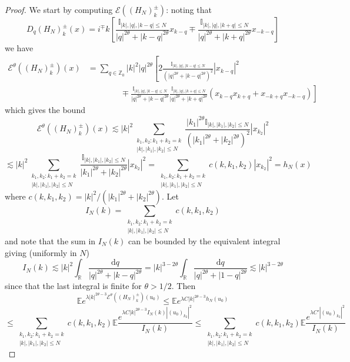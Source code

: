 \documentclass[11pt,a4paper,reqno]{amsart}
\newcommand{\II}{\mathbb{I}}
\newcommand{\RR}{\mathbb{R}}
\newcommand{\ZZ}{\mathbb{Z}}
\newcommand{\expect}{\mathbb{E}}
\newcommand{\cE}{\mathcal{E}}
\newcommand{\dd}{\mathrm{d}}
\begin{document}
\begin{proof}
We start by computing $\cE((H_N)^\pm_k)$: noting that
$$
D_q (H_{N})^\pm_k(x)=  i^\mp k  \left[  \frac{\II_{|k|,|q|,|k-q|\le N}}{|q|^{2\theta}+|k-q|^{2\theta}}  x_{k-q}\mp \frac{\II_{|k|,|q|,|k+q|\le N}}{|q|^{2\theta}+|k+q|^{2\theta}}  x_{-k-q}\right]
$$ 
we have
\begin{equation*}
\begin{split}
 \cE^\theta((H_N)^\pm_k)(x) & = \sum_{q\in\ZZ_0} |k|^2 |q|^{2\theta}\left[
 2 \frac{\II_{|k|,|q|,|k-q|\le N}}{(|q|^{2\theta}+|k-q|^{2\theta})^2}  |x_{k-q}|^2
 \right . \\
  & \left .
 \qquad \qquad \mp \frac{\II_{|k|,|q|,|k-q|\le N}}{|q|^{2\theta}+|k-q|^{2\theta}}  \frac{\II_{|k|,|q|,|k+q|\le N}}{|q|^{2\theta}+|k+q|^{2\theta}}  (x_{k-q} x_{k+q}+x_{-k+q} x_{-k-q})
 \right]
\end{split}
\end{equation*}
which gives the bound
$$
 \cE^\theta((H_N)^\pm_k)(x)\lesssim   |k|^2  \sum_{\substack{k_1,k_2 :k_1+k_2=k\\|k|,|k_1|,|k_2|\le N}} \frac{|k_1|^{2\theta}\II_{|k|,|k_1|,|k_2|\le N}}{(|k_1|^{2\theta}+|k_2|^{2\theta})^2}  |x_{k_2}|^2 
$$
$$
\lesssim  |k|^2  \sum_{\substack{k_1,k_2 :k_1+k_2=k\\|k|,|k_1|,|k_2|\le N}} \frac{\II_{|k|,|k_1|,|k_2|\le N}}{|k_1|^{2\theta}+|k_2|^{2\theta}}  |x_{k_2}|^2 =   \sum_{\substack{k_1,k_2 :k_1+k_2=k\\|k|,|k_1|,|k_2|\le N}}c(k,k_1,k_2) |x_{k_2}|^2  = h_N(x)
$$
where $c(k,k_1,k_2) = |k|^2/(|k_1|^{2\theta}+|k_2|^{2\theta})$.
Let $$
I_N(k) =  \sum_{\substack{k_1,k_2 :k_1+k_2=k\\|k|,|k_1|,|k_2|\le N}}  c(k,k_1,k_2) 
$$
and note that the sum in $I_N(k)$ can be bounded by the equivalent integral giving (uniformly in $N$)
$$
I_N(k) \lesssim  |k|^{2}  \int_{\RR} \frac{\dd q}{|q|^{2\theta}+|k-q|^{2\theta}} 
= |k|^{3-2\theta}  \int_{\RR} \frac{\dd q}{|q|^{2\theta}+|1-q|^{2\theta}} \lesssim |k|^{3-2\theta} 
$$
since that the last integral is finite for $\theta > 1/2$. Then
$$
\expect e^{\lambda |k|^{2\theta-3}\cE^\theta((H_N)^\pm_k)(u_0)} \le \expect e^{\lambda C|k|^{2\theta-3} h_N(u_0)}
$$
$$
 \le \sum_{\substack{k_1,k_2 :k_1+k_2=k\\|k|,|k_1|,|k_2|\le N}} c(k,k_1,k_2)  \expect \frac{e^{\lambda C |k|^{2\theta-3} I_N(k) |(u_0)_{k_2}|^2}}{I_N(k)}
\le \sum_{\substack{k_1,k_2 :k_1+k_2=k\\|k|,|k_1|,|k_2|\le N}} c(k,k_1,k_2)  \expect \frac{e^{\lambda C'|(u_0)_{k_2}|^2}}{I_N(k)} 
$$
\end{proof}
\end{document}

